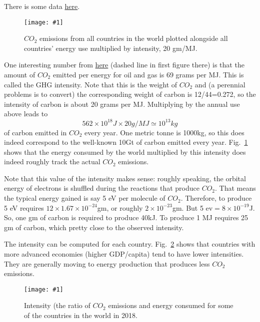 \documentclass[11pt]{book}
\def\be{\begin{equation}}
\def\ee{\end{equation}}
\newcommand{\sfig}[2]{
\texttt{[image: \#1]}
        }
\newcommand{\Spng}[2]{
   \begin{figure}[thbp]
   \begin{center}
    \sfig{../Figures/#1.png}{0.7\columnwidth}
    \caption{{\small #2}}
    \label{fig:#1}
     \end{center}
   \end{figure}
}
\newcommand{\rf}[1]{\ref{fig:#1}}
\begin{document}
There is some data \href{https://github.com/owid/co2-data}{here}.

\Spng{world_energy_co2}{$CO_2$ emissions from all countries in the world plotted alongside all countries' energy use multiplied by intensity, 20 gm/MJ.}
One interesting number from \href{https://www.science.org/doi/10.1126/science.abh0687}{here} (dashed line in first figure there) is that the amount of $CO_2$ emitted per energy for oil and gas is 69 grams per MJ. This is called the GHG intensity. Note that this is the weight of $CO_2$ and (a perennial problems is to convert) the corresponding weight of carbon is 12/44=0.272, so the intensity of carbon is about 20 grams per MJ. Multiplying by the annual use above leads to 
\be
562\times 10^{18} J \times 20 g/MJ \simeq 10^{13} kg
\ee
of carbon emitted in $CO_2$ every year. One metric tonne is 1000kg, so this does indeed correspond to the well-known 10Gt of carbon emitted every year.
Fig.~\rf{world_energy_co2} shows that the energy consumed by the world multiplied by this intensity does indeed roughly track the actual $CO_2$ emissions.

Note that this value of the intensity makes sense: roughly speaking, the orbital energy of electrons is shuffled during the reactions that produce $CO_2$. That means the typical energy gained is say 5 eV per molecule of $CO_2$. Therefore, to produce 5 eV requires $12\times 1.67\times 10^{-24}$gm, or roughly $2\times10^{-23}$gm. But 5 ev$=8\times 10^{-19}$J. So, one gm of carbon is required to produce 40kJ. To produce 1 MJ requires 25 gm of carbon, which pretty close to the observed intensity.

The intensity can be computed for each country. Fig.~\rf{intensity18} shows that countries with more advanced economies (higher GDP/capita) tend to have lower intensities. They are generally moving to energy production that produces less $CO_2$ emissions. 
\Spng{intensity18}{Intensity (the ratio of $CO_2$ emissions and energy consumed for some of the countries in the world in 2018.}

\end{document}
